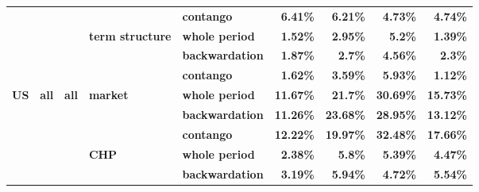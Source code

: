 \documentclass[
  authoryear,
  preprint,
  3p]{elsarticle}
\begin{document}
\begin{longtable}[t]{>{}l>{}l>{}l>{}l>{}l>{}r>{}r>{}r>{}r}
\textbf{} & \textbf{} & \textbf{} & \textbf{} & \textbf{contango} & \textcolor[HTML]{4285f4}{\textbf{6.41\%}} & \textcolor[HTML]{4285f4}{\textbf{6.21\%}} & \textcolor[HTML]{4285f4}{\textbf{4.73\%}} & \textcolor[HTML]{4285f4}{\textbf{4.74\%}}\\
\textbf{} & \textbf{} & \textbf{} & \textbf{term structure} & \textbf{whole period} & \textcolor[HTML]{4285f4}{\textbf{1.52\%}} & \textcolor[HTML]{4285f4}{\textbf{2.95\%}} & \textcolor[HTML]{4285f4}{\textbf{5.2\%}} & \textcolor[HTML]{4285f4}{\textbf{1.39\%}}\\
\addlinespace
\textbf{} & \textbf{} & \textbf{} & \textbf{} & \textbf{backwardation} & \textcolor[HTML]{4285f4}{\textbf{1.87\%}} & \textcolor[HTML]{4285f4}{\textbf{2.7\%}} & \textcolor[HTML]{4285f4}{\textbf{4.56\%}} & \textcolor[HTML]{4285f4}{\textbf{2.3\%}}\\
\textbf{} & \textbf{} & \textbf{} & \textbf{} & \textbf{contango} & \textcolor[HTML]{4285f4}{\textbf{1.62\%}} & \textcolor[HTML]{4285f4}{\textbf{3.59\%}} & \textcolor[HTML]{4285f4}{\textbf{5.93\%}} & \textcolor[HTML]{4285f4}{\textbf{1.12\%}}\\
\textbf{US} & \textbf{all} & \textbf{all} & \textbf{market} & \textbf{whole period} & \textcolor[HTML]{4285f4}{\textbf{11.67\%}} & \textcolor[HTML]{4285f4}{\textbf{21.7\%}} & \textcolor[HTML]{4285f4}{\textbf{30.69\%}} & \textcolor[HTML]{4285f4}{\textbf{15.73\%}}\\
\textbf{} & \textbf{} & \textbf{} & \textbf{} & \textbf{backwardation} & \textcolor[HTML]{4285f4}{\textbf{11.26\%}} & \textcolor[HTML]{4285f4}{\textbf{23.68\%}} & \textcolor[HTML]{4285f4}{\textbf{28.95\%}} & \textcolor[HTML]{4285f4}{\textbf{13.12\%}}\\
\textbf{} & \textbf{} & \textbf{} & \textbf{} & \textbf{contango} & \textcolor[HTML]{4285f4}{\textbf{12.22\%}} & \textcolor[HTML]{4285f4}{\textbf{19.97\%}} & \textcolor[HTML]{4285f4}{\textbf{32.48\%}} & \textcolor[HTML]{4285f4}{\textbf{17.66\%}}\\
\addlinespace
\textbf{} & \textbf{} & \textbf{} & \textbf{CHP} & \textbf{whole period} & \textcolor[HTML]{4285f4}{\textbf{2.38\%}} & \textcolor[HTML]{4285f4}{\textbf{5.8\%}} & \textcolor[HTML]{4285f4}{\textbf{5.39\%}} & \textcolor[HTML]{4285f4}{\textbf{4.47\%}}\\
\textbf{} & \textbf{} & \textbf{} & \textbf{} & \textbf{backwardation} & \textcolor[HTML]{4285f4}{\textbf{3.19\%}} & \textcolor[HTML]{4285f4}{\textbf{5.94\%}} & \textcolor[HTML]{4285f4}{\textbf{4.72\%}} & \textcolor[HTML]{4285f4}{\textbf{5.54\%}}\\

\end{longtable}
\end{document}
